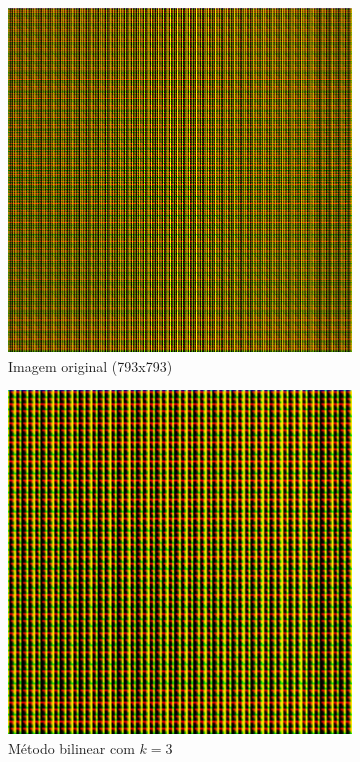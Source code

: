\documentclass[leqno]{article}
\begin{document}
\begin{figure}[H]
    \centering
    \begin{subfigure}{.33\textwidth}
      \centering
      \includegraphics[width=.7\linewidth]{../images/func_2_color.png}
      \caption{Imagem original  (793x793) }
      \label{fig:sub1}
    \end{subfigure}%
    \begin{subfigure}{.33\textwidth}
      \centering
      \includegraphics[width=.7\linewidth]{../images/func_2_color_bil.png}
      \caption{Método bilinear com $k = 3$}
      \label{fig:sub2}
    \end{subfigure}
    \begin{subfigure}{.33\textwidth}
        \centering

\end{subfigure}
\end{figure}
\end{document}
